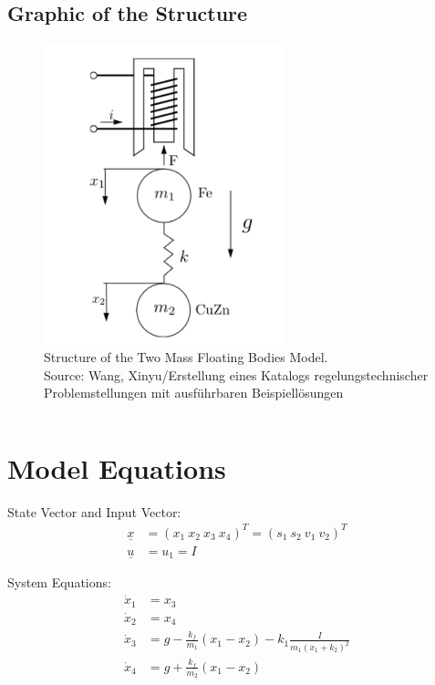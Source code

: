 \documentclass[10pt,a4paper]{article}
\begin{document}
	\subsection{Graphic of the Structure}	
	\begin{figure}[H]
		\centering
		\captionsetup{justification=centering, margin=1cm}
		\includegraphics[width=70mm]{two_mass_floating_bodies.pdf}
		\caption{Structure of the Two Mass Floating Bodies Model. \\ \footnotesize{Source: Wang, Xinyu/Erstellung eines Katalogs regelungstechnischer Problemstellungen mit ausführbaren Beispiellösungen }}
	\end{figure}
	
	\begin{tabular}{ll}

	\end{tabular}
	
	
	\section{Model Equations} %
	
	State Vector and Input Vector:
	\begin{align*}
		\underline{x} &= (x_1 \ x_2 \ x_3 \ x_4)^T = (s_1 \ s_2 \ v_1 \ v_2)^T \\
		\underline{u} &= u_1 = I
	\end{align*}
	
	\noindent System Equations:			
	\begin{subequations}
	\begin{align}
		\dot{x}_1 &= x_3 \\
		\dot{x}_2 &= x_4 \\
		\dot{x}_3 &= g - \frac{k_f}{m_1}(x_1 - x_2) - k_1\frac{I}{m_1(x_1+k_2)^2}  \\
		\dot{x}_4 &= g + \frac{k_f}{m_2}(x_1 - x_2) \\
	\end{align}
	\end{subequations}
\end{document}
